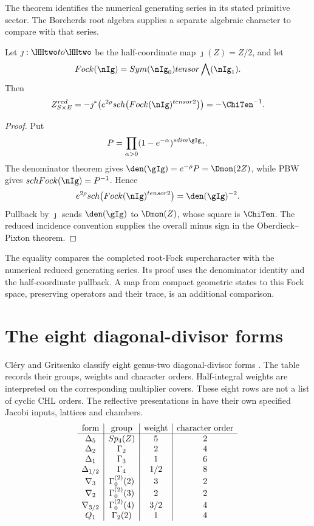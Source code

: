 The theorem identifies the numerical generating series in its stated
primitive sector. The Borcherds root algebra supplies a separate
algebraic character to compare with that series.

\begin{corollary}
Let $\jmath:\HHtwo\to\HHtwo$ be the half-coordinate map $\jmath(Z)=Z/2$, and let
\[
 \Fock(\nIg)=
 \Sym(\nIg_{\bar0})\tensor\bigwedge(\nIg_{\bar1}).
\]
Then
\[
 \mathcal Z^{\red}_{S\times E}
 =-\jmath^*\!\left(
 e^{2\rho}\sch\bigl(\Fock(\nIg)^{\tensor2}\bigr)
 \right)
 =-\ChiTen^{-1}.
\]
\end{corollary}
\begin{proof}
Put
\[
 P=\prod_{\alpha>0}(1-e^{-\alpha})^{\sdim\gIg_\alpha}.
\]
The denominator theorem gives $\den(\gIg)=e^{-\rho}P=\Dmon(2Z)$, while PBW gives $\sch\Fock(\nIg)=P^{-1}$.  Hence
\[
 e^{2\rho}\sch\bigl(\Fock(\nIg)^{\tensor2}\bigr)
 =\den(\gIg)^{-2}.
\]
Pullback by $\jmath$ sends $\den(\gIg)$ to $\Dmon(Z)$, whose square is $\ChiTen$.  The reduced incidence convention supplies the overall minus sign in the Oberdieck--Pixton theorem.
\end{proof}

The equality compares the completed root-Fock supercharacter with the
numerical reduced generating series. Its proof uses the denominator
identity and the half-coordinate pullback. A map from compact geometric
states to this Fock space, preserving operators and their trace,
is an additional comparison.


\section{The eight diagonal-divisor forms}
Cl\'ery and Gritsenko classify eight genus-two diagonal-divisor
forms \cite{GC}. The table records their groups, weights and
character orders. Half-integral weights are interpreted on the
corresponding multiplier covers. These eight rows are not a list
of cyclic CHL orders. The reflective presentations in
\cite{GN97,GN98a,GN98b,GovindarajanKrishna2009,Govindarajan2011,GovindarajanSamanta2019}
have their own specified Jacobi inputs, lattices and chambers.
\[
\begin{array}{c|c|c|c}
\text{form}&\text{group}&\text{weight}&\text{character order}\\ \hline
\Delta_5&Sp_4(Z)&5&2\\
\Delta_2&\Gamma_2&2&4\\
\Delta_1&\Gamma_3&1&6\\
\Delta_{1/2}&\Gamma_4&1/2&8\\
\nabla_3&\Gamma^{(2)}_0(2)&3&2\\
\nabla_2&\Gamma^{(2)}_0(3)&2&2\\
\nabla_{3/2}&\Gamma^{(2)}_0(4)&3/2&4\\
Q_1&\Gamma_2(2)&1&4
\end{array}
\]


